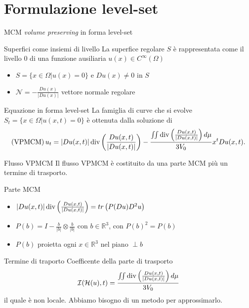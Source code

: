 \section{Formulazione level-set}
\begin{frame}{MCM \emph{volume preserving} in forma level-set}
  \begin{block}{Superfici come insiemi di livello}
    La superfice regolare $S$ è rappresentata come il livello $0$ di
    una funzione ausiliaria $u(x)\in C^{\infty}(\Omega)$
    \begin{itemize}
      \item $S=\{x\in\Omega | u(x)=0\}$ e $Du(x)\neq 0$ in $S$
      \item $\mathcal{N}=-\frac{Du(x)}{|Du(x)|}$ vettore normale
        regolare
    \end{itemize}
  \end{block}
  \begin{block}{Equazione in forma level-set}
    La famiglia di curve che si evolve $S_t=\{x\in\Omega | u(x,t)=0\}$
    è ottenuta dalla soluzione di
    \[
      (\text{VPMCM})\,u_t=|Du(x,t)|\operatorname{div}\left(\frac{Du(x,t)}{|Du(x,t)|}\right)-\frac{\iint\operatorname{div}\left(\frac{Du(x,t)}{|Du(x,t)|}\right)d\mu}{3V_0}x^tDu(x,t). 
      \]
  \end{block}
\end{frame}

\begin{frame}{Flusso VPMCM}
  Il flusso VPMCM è costituito da una parte MCM più un termine di trasporto.
  \begin{block}{Parte MCM} 
    \begin{itemize}
    \item
      $|Du(x,t)|\operatorname{div}\left(\frac{Du(x,t)}{|Du(x,t)|}\right)=tr\left(P(Du)D^2u\right)$
    \item $P(b)=I-\frac{b}{|b|}\otimes\frac{b}{|b|}$ con
      $b\in\mathbb{R}^3$, con $P(b)^2=P(b)$
    \item $P(b)$ proietta ogni $x\in\mathbb{R}^3$ nel piano $\perp b$
    \end{itemize}
  \end{block}
  \begin{block}{Termine di traporto}
     Coefficente della parte di trasporto
    \[
    \mathcal{I}(\mathcal{H}(u),t)=\frac{\iint\operatorname{div}\left(\frac{Du(x,t)}{|Du(x,t)|}\right)d\mu}{3V_0}
    \] 
    il quale è non locale. Abbiamo bisogno di un metodo per
    approssimarlo.
  \end{block}
\end{frame}


